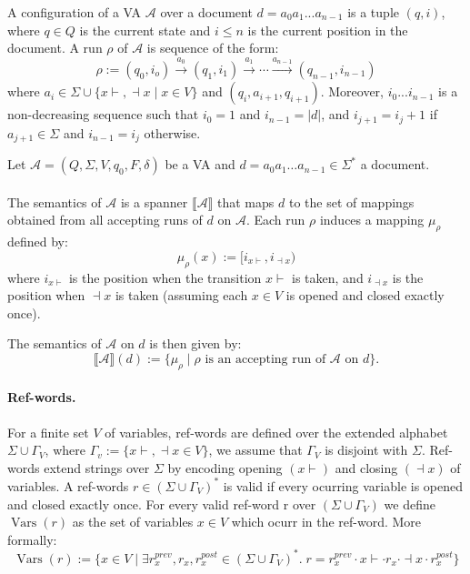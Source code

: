 \documentclass{article}
\newcommand{\ox}{x\!\vdash}
\newcommand{\cx}{\dashv\!x}
\newcommand{\Vars}{\operatorname{Vars}}
\begin{document}
A configuration of a VA $\mathcal{A}$ over a document $d = a_0 a_1 ... a_{n-1}$ is a tuple $(q, i)$, where $q \in Q$ is the current state and $i \leq n$ is the current position in the document. A run $\rho$ of $\mathcal{A}$ is sequence of the form: \[\rho := (q_0, i_o) \xrightarrow[]{a_0}(q_1, i_1) \xrightarrow[]{a_1} \cdots \xrightarrow[]{a_{n-1}} (q_{n-1}, i_{n-1})\]where $a_i \in \Sigma \cup \{\ox, \cx\; | \; x \in V\}$ and $(q_i, a_{i+1}, q_{i+1})$. Moreover, $i_0...i_{n-1}$ is a non-decreasing sequence such that $i_0 = 1$ and $i_{n-1} = |d|$, and $i_{j+1} = i_j + 1$ if $a_{j+1} \in \Sigma$ and $i_{n-1} = i_{j}$ otherwise. 

Let $\mathcal{A} = (Q, \Sigma, V, q_0, F, \delta)$ be a VA and $d = a_0 a_1 \dots a_{n-1} \in \Sigma^*$ a document.
\paragraph{}The semantics of $\mathcal{A}$ is a spanner 
$\llbracket \mathcal{A} \rrbracket$ 
that maps $d$ to the set of mappings obtained from all accepting runs of  $d$ on $\mathcal{A}$. Each run $\rho$ induces a mapping $\mu_\rho$ defined by:
\[
\mu_\rho(x) := [i_{\ox}, i_{\cx})
\]
where $i_{\ox}$ is the position when the transition 
$\ox$ is taken, and $i_{\cx}$ is the position when 
$\cx$ is taken (assuming each $x \in V$ is opened and closed exactly once).

The semantics of $\mathcal{A}$ on $d$ is then given by:
\[
\llbracket \mathcal{A} \rrbracket(d) := 
\{ \mu_\rho \mid \rho \text{ is an accepting run of } \mathcal{A} \text{ on } d \}.
\]



\paragraph{Ref-words.} For a finite set $V$ of variables, ref-words are defined over the extended alphabet $\Sigma \cup \Gamma_V$, where $\Gamma_v := \{\ox, \cx \in V\}$, we assume that $\Gamma_V$ is disjoint with $\Sigma$. Ref-words extend strings over $\Sigma$ by encoding opening $(\ox)$ and closing $(\cx)$ of variables.
A ref-words $r \in (\Sigma \cup \Gamma_V)^*$ is valid if every ocurring variable is opened and closed exactly once. For every valid ref-word r over $(\Sigma \cup \Gamma_V)$ we define $\Vars(r)$ as the set of variables $x \in V$ which ocurr in the ref-word. More formally:
\[
\Vars(r) := \{ x \in V \; | \; \exists r^{prev}_x, r_x, r_x^{post} \in (\Sigma \cup \Gamma_V)^*.\; r = r_x^{prev} \cdot x\vdash \cdot r_x \cdot \dashv x \cdot r_x^{post}\}
\]
\end{document}

